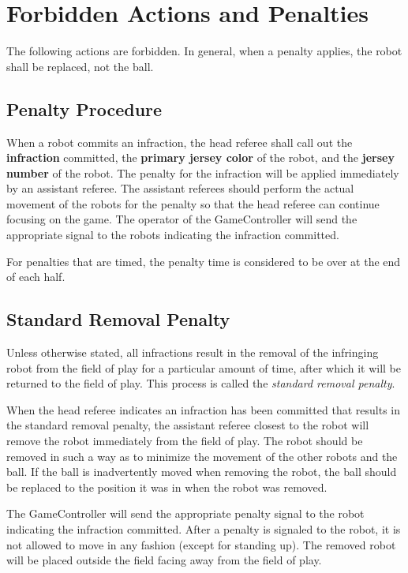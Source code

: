 \section{Forbidden Actions and Penalties}
\label{sec:forbidden_act}

The following actions are forbidden.
In general, when a penalty applies, the robot shall be replaced, not the ball.

\subsection{Penalty Procedure}
\label{sec:penalty_procedure}

When a robot commits an infraction, the head referee shall call out the \textbf{infraction} committed, the \textbf{primary jersey color} of the robot, and the \textbf{jersey number} of the robot.
The penalty for the infraction will be applied immediately by an assistant referee.
The assistant referees should perform the actual movement of the robots for the penalty so that the head referee can continue focusing on the game.
The operator of the GameController will send the appropriate signal to the robots indicating the infraction committed.

For penalties that are timed, the penalty time is considered to be over at the end of each half.

\subsection{Standard Removal Penalty}
\label{sec:removal_penalty}

Unless otherwise stated, all infractions result in the removal of the infringing robot from the field of play for a particular amount of time, after which it will be returned to the field of play.
This process is called the \textit{standard removal penalty}.

When the head referee indicates an infraction has been committed that results in the standard removal penalty, the assistant referee closest to the robot will remove the robot immediately from the field of play.
The robot should be removed in such a way as to minimize the movement of the other robots and the ball.
If the ball is inadvertently moved when removing the robot, the ball should be replaced to the position it was in when the robot was removed.

The GameController will send the appropriate penalty signal to the robot indicating the infraction committed.
After a penalty is signaled to the robot, it is not allowed to move in any fashion (except for standing up).
The removed robot will be placed outside the field facing away from the field of play.

